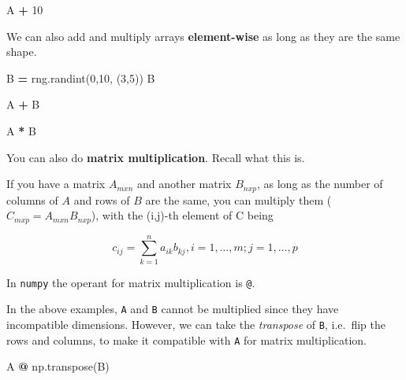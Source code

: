 \documentclass[
  letterpaper,
]{scrbook}
\newenvironment{Shaded}{\begin{snugshade}}{\end{snugshade}}
\newcommand{\DecValTok}[1]{\textcolor[rgb]{0.00,0.00,0.81}{#1}}
\newcommand{\NormalTok}[1]{#1}
\newcommand{\OperatorTok}[1]{\textcolor[rgb]{0.81,0.36,0.00}{\textbf{#1}}}
\begin{document}
\begin{Shaded}
\begin{Highlighting}[]
\NormalTok{A }\OperatorTok{+} \DecValTok{10}
\end{Highlighting}
\end{Shaded}

We can also add and multiply arrays \textbf{element-wise} as long as they are the same shape.

\begin{Shaded}
\begin{Highlighting}[]
\NormalTok{B }\OperatorTok{=}\NormalTok{ rng.randint(}\DecValTok{0}\NormalTok{,}\DecValTok{10}\NormalTok{, (}\DecValTok{3}\NormalTok{,}\DecValTok{5}\NormalTok{))}
\NormalTok{B}
\end{Highlighting}
\end{Shaded}

\begin{Shaded}
\begin{Highlighting}[]
\NormalTok{A }\OperatorTok{+}\NormalTok{ B}
\end{Highlighting}
\end{Shaded}

\begin{Shaded}
\begin{Highlighting}[]
\NormalTok{A }\OperatorTok{*}\NormalTok{ B}
\end{Highlighting}
\end{Shaded}

You can also do \textbf{matrix multiplication}. Recall what this is.

If you have a matrix \(A_{m x n}\) and another matrix \(B_{n x p}\), as long as the number of columns of \(A\) and rows of \(B\) are the same, you can multiply them (\(C_{m x p} = A_{m x n}B_{n x p}\)), with the (i,j)-th element of C being

\[ c_{ij} = \sum_{k=1}^n a_{ik}b_{kj}, i= 1, \dots, m; j = 1, \dots, p\]

In \texttt{numpy} the operant for matrix multiplication is \texttt{@}.

In the above examples, \texttt{A} and \texttt{B} cannot be multiplied since they have incompatible dimensions. However, we can take the \emph{transpose} of \texttt{B}, i.e.~flip the rows and columns, to make it compatible with \texttt{A} for matrix multiplication.

\begin{Shaded}
\begin{Highlighting}[]
\NormalTok{A }\OperatorTok{@}\NormalTok{ np.transpose(B)}
\end{Highlighting}
\end{Shaded}
\end{document}
